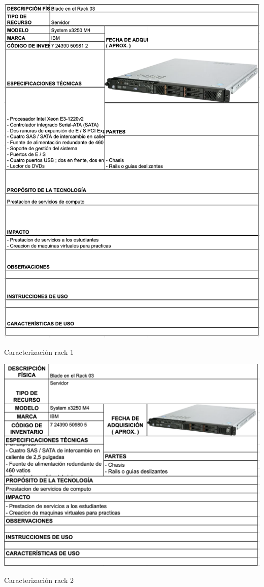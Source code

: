 \begin{table}[H]
    \centering
    \includegraphics[width=\textwidth]{tablas-images/cp1/racks/rack-1.png}
    \caption{Caracterización rack 1}\label{tab:rack-1}
\end{table}

\begin{table}[H]
    \centering
    \includegraphics[width=\textwidth]{tablas-images/cp1/racks/rack-2.png}
    \caption{Caracterización rack 2}\label{tab:rack-2}
\end{table}

